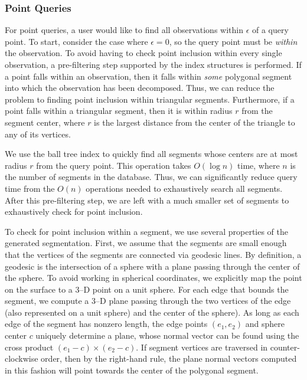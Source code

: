 \documentclass[twocolumn]{extarticle}
\begin{document}
\subsubsection*{Point Queries}

For point queries, a user would like to find all observations within $\epsilon$
of a query point.  To start, consider the case where $\epsilon = 0$, so the
query point must be \emph{within} the observation. To avoid having to check
point inclusion within every single observation, a pre-filtering step supported
by the index structures is performed. If a point falls within an observation,
then it falls within \emph{some} polygonal segment into which the observation
has been decomposed. Thus, we can reduce the problem to finding point inclusion
within triangular segments. Furthermore, if a point falls within a triangular
segment, then it is within radius $r$ from the segment center, where $r$ is the
largest distance from the center of the triangle to any of its vertices.

We use the ball tree index to quickly find all segments whose centers are at
most radius $r$ from the query point. This operation takes $O(\log n)$ time,
where $n$ is the number of segments in the database. Thus, we can significantly
reduce query time from the $O(n)$ operations needed to exhaustively search all
segments. After this pre-filtering step, we are left with a much smaller set of
segments to exhaustively check for point inclusion.

To check for point inclusion within a segment, we use several properties of the
generated segmentation. First, we assume that the segments are small enough that
the vertices of the segments are connected via geodesic lines. By definition, a
geodesic is the intersection of a sphere with a plane passing through the
center of the sphere. To avoid working in spherical coordinates, we explicitly
map the point on the surface to a 3--D point on a unit sphere. For each edge
that bounds the segment, we compute a 3--D plane passing through the two
vertices of the edge (also represented on a unit sphere) and the center of the
sphere). As long as each edge of the segment has nonzero length,
the edge points $(e_1, e_2)$ and sphere center $c$ uniquely determine a plane,
whose normal vector can be found using the cross product $(e_1 - c)\times (e_2 -
c)$. If segment vertices are traversed in counter-clockwise order, then by the
right-hand rule, the plane normal vectors computed in this fashion will point
towards the center of the polygonal segment.
\end{document}
